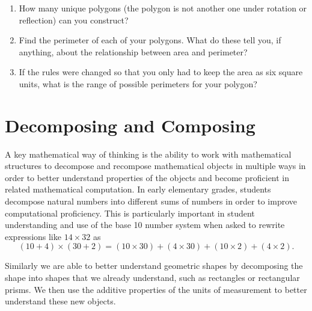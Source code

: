 \documentclass[
]{book}
\providecommand{\tightlist}{%
  \setlength{\itemsep}{0pt}\setlength{\parskip}{0pt}}
\theoremstyle{definition}
\theoremstyle{definition}
\theoremstyle{definition}
\theoremstyle{definition}
\theoremstyle{remark}
\begin{document}
\begin{enumerate}
  \begin{enumerate}
  \def\labelenumii{\alph{enumii}.}
  \tightlist
  \item
    How many unique polygons (the polygon is not another one under rotation or reflection) can you construct?
  \item
    Find the perimeter of each of your polygons. What do these tell you, if anything, about the relationship between area and perimeter?
  \item
    If the rules were changed so that you only had to keep the area as six square units, what is the range of possible perimeters for your polygon?
  \end{enumerate}
\end{enumerate}

\hypertarget{decomposing-and-composing}{%
\section{Decomposing and Composing}\label{decomposing-and-composing}}

A key mathematical way of thinking is the ability to work with mathematical structures to decompose and recompose mathematical objects in multiple ways in order to better understand properties of the objects and become proficient in related mathematical computation. In early elementary grades, students decompose natural numbers into different sums of numbers in order to improve computational proficiency. This is particularly important in student understanding and use of the base 10 number system when asked to rewrite expressions like \(14 \times 32\) as \[(10+4)\times (30 +2) = (10 \times 30)+(4\times 30)+(10\times 2)+(4 \times 2).\]

Similarly we are able to better understand geometric shapes by decomposing the shape into shapes that we already understand, such as rectangles or rectangular prisms. We then use the additive properties of the units of measurement to better understand these new objects.
\end{document}
